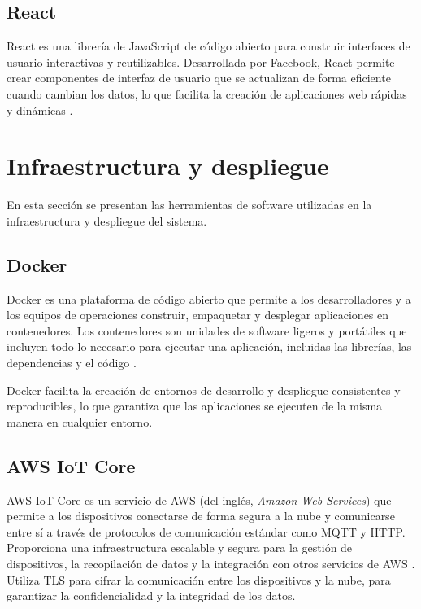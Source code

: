 \subsection{React}

React es una librería de JavaScript de código abierto para construir interfaces
de usuario interactivas y reutilizables. Desarrollada por Facebook, React
permite crear componentes de interfaz de usuario que se actualizan de forma
eficiente cuando cambian los datos, lo que facilita la creación de aplicaciones
web rápidas y dinámicas \cite{React}.


\section{Infraestructura y despliegue}

En esta sección se presentan las herramientas de software utilizadas en la
infraestructura y despliegue del sistema.
\subsection{Docker}

Docker es una plataforma de código abierto que permite a los desarrolladores y
a los equipos de operaciones construir, empaquetar y desplegar aplicaciones en
contenedores. Los contenedores son unidades de software ligeros y portátiles
que incluyen todo lo necesario para ejecutar una aplicación, incluidas las
librerías, las dependencias y el código \cite{Docker}.

Docker facilita la creación de entornos de desarrollo y despliegue consistentes
y reproducibles, lo que garantiza que las aplicaciones se ejecuten de la misma
manera en cualquier entorno.

\subsection{AWS IoT Core}

AWS IoT Core es un servicio de AWS (del inglés, \textit{Amazon Web Services})
que permite a los dispositivos conectarse de forma segura a la nube y
comunicarse entre sí a través de protocolos de comunicación estándar como MQTT
y HTTP. Proporciona una infraestructura escalable y segura para la gestión de
dispositivos, la recopilación de datos y la integración con otros servicios de
AWS \cite{AWS_IoT}. Utiliza TLS para cifrar la comunicación entre los
dispositivos y la nube, para garantizar la confidencialidad y la integridad de
los datos.

